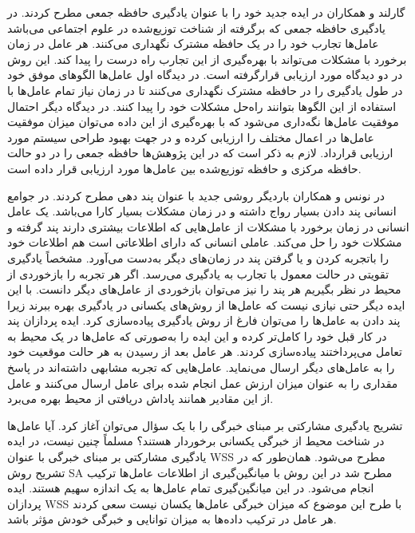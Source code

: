 گارلند و همکاران در  ایده جدید خود را با عنوان یادگیری حافظه جمعی مطرح کردند. در یادگیری حافظه جمعی که برگرفته از شناخت توزیع‌شده در علوم اجتماعی می‌باشد عامل‌ها تجارب خود را در یک حافظه مشترک نگهداری می‌کنند. هر عامل در زمان برخورد با مشکلات می‌تواند با بهره‌گیری از این تجارب راه درست را پیدا کند.
این روش در دو دیدگاه مورد ارزیابی قرارگرفته است. در دیدگاه اول عامل‌ها الگوهای موفق خود در طول یادگیری را در حافظه مشترک نگهداری می‌کنند تا در زمان نیاز تمام عامل‌ها با استفاده از این الگوها بتوانند راه‌حل مشکلات خود را پیدا کنند. در دیدگاه دیگر احتمال موفقیت عامل‌ها نگه‌داری می‌شود که با بهره‌گیری از این داده می‌توان میزان موفقیت عامل‌ها در اعمال مختلف را ارزیابی کرده و در جهت بهبود طراحی سیستم مورد ارزیابی قرارداد. لازم به ذکر است که در این پژوهش‌ها حافظه جمعی را در دو حالت حافظه مرکزی و حافظه توزیع‌شده بین عامل‌ها مورد ارزیابی قرار داده است.

در  نونس و همکاران باردیگر روشی جدید با عنوان پند دهی مطرح کردند. در جوامع انسانی پند دادن بسیار رواج داشته و در زمان مشکلات بسیار کارا می‌باشد. یک عامل انسانی در زمان برخورد با مشکلات از عامل‌هایی که اطلاعات بیشتری دارند پند گرفته و مشکلات خود را حل می‌کند. عاملی انسانی که دارای اطلاعاتی است هم اطلاعات خود را باتجربه کردن و یا گرفتن پند در زمان‌های دیگر به‌دست می‌آورد. مشخصاً یادگیری تقویتی در حالت معمول با تجارب به یادگیری می‌رسد. اگر هر تجربه را بازخوردی از محیط در نظر بگیریم هر پند را نیز می‌توان بازخوردی از عامل‌های دیگر دانست. با این ایده دیگر حتی نیازی نیست که عامل‌ها از روش‌های یکسانی در یادگیری بهره ببرند زیرا پند دادن به عامل‌ها را می‌توان فارغ از روش یادگیری پیاده‌سازی کرد.
ایده پردازان پند در کار قبل خود را کامل‌تر کرده و این ایده را به‌صورتی که عامل‌ها در یک محیط به تعامل می‌پرداختند پیاده‌سازی کردند. هر عامل بعد از رسیدن به هر حالت موقعیت خود را به عامل‌های دیگر ارسال می‌نماید. عامل‌هایی که تجربه مشابهی داشته‌اند در پاسخ مقداری را به عنوان میزان ارزش عمل انجام شده برای عامل ارسال می‌کنند و عامل از این مقادیر همانند پاداش دریافتی از محیط بهره می‌برد.

تشریح یادگیری مشارکتی بر مبنای خبرگی را با یک سؤال می‌توان آغاز کرد. آیا عامل‌ها در شناخت محیط از خبرگی یکسانی برخوردار هستند؟ مسلماً چنین نیست، در ایده یادگیری مشارکتی بر مبنای خبرگی با عنوان WSS مطرح می‌شود.
همان‌طور که در تشریح روش SA مطرح شد در این روش با میانگین‌گیری از اطلاعات عامل‌ها ترکیب انجام می‌شود. در این میانگین‌گیری تمام عامل‌ها به یک اندازه سهیم هستند. ایده پردازان WSS با طرح این موضوع که میزان خبرگی عامل‌ها یکسان نیست سعی کردند هر عامل در ترکیب داده‌ها به میزان توانایی و خبرگی خودش مؤثر باشد.

